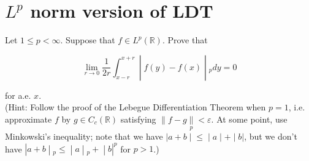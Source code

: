 \section{\texorpdfstring{\(L^{p}\) norm version of LDT}{L\^{}\{p\} norm version of LDT}}\label{lp-norm-version-of-ldt}

Let \(1 \leq p < \infty\). Suppose that \(f \in L^{p}(\mathbb{R})\). Prove that

\[\left. \lim\limits_{r\rightarrow 0}\frac{1}{2r}\int_{x - r}^{x + r} \middle| f(y) - f(x) \middle| {}_{p} dy = 0 \right.\]

for a.e. \(x\).\\
(Hint: Follow the proof of the Lebegue Differentiation Theorem when \(p = 1\), i.e. approximate \(f\) by \(g \in C_{c}(\mathbb{R})\) satisfying \(\parallel f - g\underset{p}{\parallel} < \varepsilon\). At some point, use Minkowski's inequality; note that we have \(\left. |a + b \middle| \leq \middle| a \middle| + \middle| b| \right.\), but we don't have \(\left. |a + b \middle| {}_{p} \leq \middle| a \middle| {}_{p} + \middle| b|^{p} \right.\) for \(p > 1\).)

